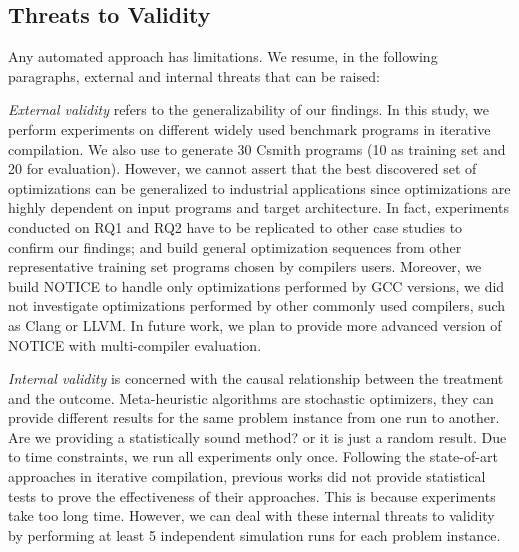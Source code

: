 \subsection{Threats to Validity}
Any automated approach has limitations. We resume, in the following paragraphs, external and internal threats that can be raised:
 
\textit{External validity} refers to the generalizability of our findings. In this study, we perform experiments on different widely used benchmark programs in iterative compilation. We also use to generate 30 Csmith programs (10 as training set and 20 for evaluation). However, we cannot assert that the best discovered set of optimizations can be generalized to industrial applications since optimizations are highly dependent on input programs and target architecture. In fact, experiments conducted on RQ1 and RQ2 have to be replicated to other case studies to confirm our findings; and build general optimization sequences from other representative training set programs chosen by compilers users.
Moreover, we build NOTICE to handle only optimizations performed by GCC versions, we did not investigate optimizations performed by other commonly used compilers, such as Clang or LLVM. In future work, we plan to provide more advanced version of NOTICE with multi-compiler evaluation.

\textit{Internal validity} is concerned with the causal relationship between the treatment and the outcome. Meta-heuristic algorithms are stochastic optimizers, they can provide different results for the same problem instance from one run to another. Are we providing a statistically sound method? or it is just a random result. Due to time constraints, we run all experiments only once. Following the state-of-art approaches in iterative compilation, previous works\cite{hoste2008cole,martinez2014multi} did not provide statistical tests to prove the effectiveness of their approaches. This is because experiments take too long time. However, we can deal with these internal threats to validity by performing at least 5 independent simulation runs for each problem instance.
 
